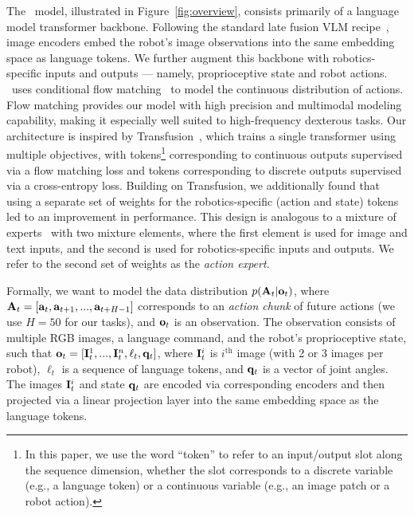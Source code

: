 The \ModelSymbol\ model, illustrated in Figure~\ref{fig:overview}, consists primarily of a language model transformer backbone. Following the standard late fusion VLM recipe~\citep{alayrac2022flamingo, driess2023palm, liu2024visual}, image encoders embed the robot's image observations into the same embedding space as language tokens. We further augment this backbone with robotics-specific inputs and outputs --- namely, proprioceptive state and robot actions. \ModelSymbol\ uses conditional flow matching~\citep{lipman2022flow, liu2022rectified} to model the continuous distribution of actions. Flow matching provides our model with high precision and multimodal modeling capability, making it especially well suited to high-frequency dexterous tasks.
Our architecture is inspired by Transfusion~\citep{zhou2024transfusion}, which trains a single transformer using multiple objectives, with tokens\footnote{In this paper, we use the word ``token'' to refer to an input/output slot along the sequence dimension, whether the slot corresponds to a discrete variable (e.g., a language token) or a continuous variable (e.g., an image patch or a robot action).} corresponding to continuous outputs supervised via a flow matching loss and tokens corresponding to discrete outputs supervised via a cross-entropy loss. Building on Transfusion, we additionally found that using a separate set of weights for the robotics-specific (action and state) tokens led to an improvement in performance. This design is analogous to a mixture of experts~\citep{shazeer2017outrageously, lepikhin2020gshard, du2022glam, fedus2022switch} with two mixture elements, where the first element is used for image and text inputs, and the second is used for robotics-specific inputs and outputs. We refer to the second set of weights as the \emph{action expert}.

Formally, we want to model the data distribution $p(\mathbf{A}_t | \mathbf{o}_t)$, where $\mathbf{A}_t = [\mathbf{a}_{t}, \mathbf{a}_{t+1}, ..., \mathbf{a}_{t+H-1}]$ corresponds to an \emph{action chunk} of future actions (we use $H = 50$ for our tasks), and $\mathbf{o}_t$ is an observation. The observation consists of multiple RGB images, a language command, and the robot's proprioceptive state, such that $\mathbf{o}_t = [\mathbf{I}^1_t, ... , \mathbf{I}^n_t, \ell_t, \mathbf{q}_t]$, where $\mathbf{I}^i_t$ is $i^\text{th}$ image (with 2 or 3 images per robot), $\ell_t$ is a sequence of language tokens, and $\mathbf{q}_t$ is a vector of joint angles. The images $\mathbf{I}^i_t$ and state $\mathbf{q}_t$ are encoded via corresponding encoders and then projected via a linear projection layer into the same embedding space as the language tokens.

